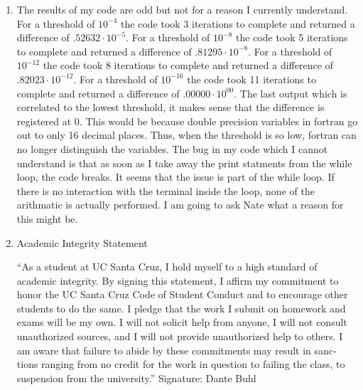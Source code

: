 \documentclass[11pt]{article}
\begin{document}
\begin{enumerate}
\item
The results of my code are odd but not for a reason I currently understand. For a threshold of $10^{-4}$ the code took 3 iterations to complete and returned a difference of $.52632 \cdot 10^{-5}$. For a threshold of $10^{-8}$ the code took 5 iterations to complete and returned a difference of $.81295 \cdot 10^{-8}$. For a threshold of $10^{-12}$ the code took 8 iterations to complete and returned a difference of $.82023 \cdot 10^{-12}$. For a threshold of $10^{-16}$ the code took 11 iterations to complete and returned a difference of $.00000 \cdot 10^{00}$. The last output which is correlated to the lowest threshold, it makes sense that the difference is registered at 0. This would be because double precision variables in fortran go out to only 16 decimal places. Thus, when the threshold is so low, fortran can no longer distinguish the variables. The bug in my code which I cannot understand is that as soon as I take away the print statments from the while loop, the code breaks. It seems that the issue is part of the while loop. If there is no interaction with the terminal inside the loop, none of the arithmatic is actually performed. I am going to ask Nate what a reason for this might be. 

\item  Academic Integrity Statement

“As a student at UC Santa Cruz, I hold myself to a high standard of
academic integrity. By signing this statement, I affirm my commitment
to honor the UC Santa Cruz Code of Student Conduct and to encourage
other students to do the same.
I pledge that the work I submit on homework and exams will be my own. I
will not solicit help from anyone, I will not consult unauthorized sources,
and I will not provide unauthorized help to others.
I am aware that failure to abide by these commitments may result in sanc-
tions ranging from no credit for the work in question to failing the class,
to suspension from the university.”
Signature: Dante Buhl 



\end{enumerate}
%

%
\end{document}
